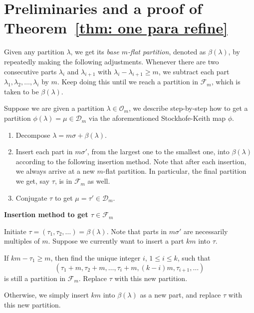 \documentclass[11pt,reqno]{amsart}
\numberwithin{equation}{section}
\theoremstyle{plain}
\theoremstyle{definition}
\newcommand{\F}{\mathcal{F}}
\newcommand{\D}{\mathcal{D}}
\newcommand{\OO}{\mathcal{O}}
\begin{document}
\fi












\iffalse

\section{Preliminaries and a proof of Theorem~\ref{thm: one para refine}}\label{sec2: one para refine}

Given any partition $\lambda$, we get its \emph{base $m$-flat partition}, denoted as $\beta(\lambda)$, by repeatedly making the following adjustments. Whenever there are two consecutive parts $\lambda_i$ and $\lambda_{i+1}$ with $\lambda_{i}-\lambda_{i+1}\ge m$, we subtract each part $\lambda_1,\lambda_2,\ldots, \lambda_i$ by $m$. Keep doing this until we reach a partition in $\F_m$, which is taken to be $\beta(\lambda)$.

Suppose we are given a partition $\lambda\in\OO_m$, we describe step-by-step how to get a partition $\phi(\lambda)=\mu\in\D_m$ via the aforementioned Stockhofe-Keith map $\phi$.
\begin{enumerate}
	\item[Step 1:] Decompose $\lambda=m\sigma+\beta(\lambda)$.
	\item[Step 2:] Insert each part in $m\sigma'$, from the largest one to the smallest one, into $\beta(\lambda)$ according to the following insertion method. Note that after each insertion, we always arrive at a new $m$-flat partition. In particular, the final partition we get, say $\tau$, is in $\F_m$ as well.
	\item[Step 3:] Conjugate $\tau$ to get $\mu=\tau'\in\D_m$.
\end{enumerate}

\begin{framed}
\begin{center}
 {\bf Insertion method to get $\tau\in\F_m$}
\end{center}
\noindent Initiate $\tau=(\tau_1,\tau_2,\ldots)=\beta(\lambda)$. Note that parts in $m\sigma'$ are necessarily multiples of $m$. Suppose we currently want to insert a part $km$ into $\tau$.

If $km-\tau_1\ge m$, then find the unique integer $i$, $1\le i\le k$, such that $$(\tau_1+m,\tau_2+m,\ldots,\tau_i+m, (k-i)m, \tau_{i+1},\ldots)$$ is still a partition in $\F_m$. Replace $\tau$ with this new partition.

Otherwise, we simply insert $km$ into $\beta(\lambda)$ as a new part, and replace $\tau$ with this new partition.
\end{framed}
\end{document}
